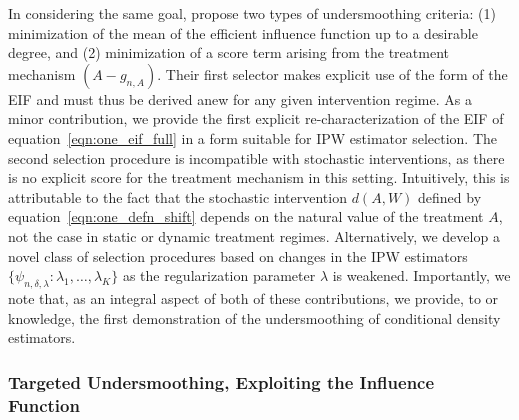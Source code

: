 In considering the same goal, \citet{ertefaie2020nonparametric} propose two
types of undersmoothing criteria: (1) minimization of the mean of the efficient
influence function up to a desirable degree, and (2) minimization of a score
term arising from the treatment mechanism $(A - g_{n,A})$. Their first selector
makes explicit use of the form of the EIF and must thus be derived anew for any
given intervention regime. As a minor contribution, we provide the first
explicit re-characterization of the EIF of equation~\eqref{eqn:one_eif_full} in
a form suitable for IPW estimator selection. The second selection procedure is
incompatible with stochastic interventions, as there is no explicit score for
the treatment mechanism in this setting. Intuitively, this is attributable to
the fact that the stochastic intervention $d(A,W)$ defined by
equation~\eqref{eqn:one_defn_shift} depends on the natural value of the
treatment $A$, not the case in static or dynamic treatment regimes.
Alternatively, we develop a novel class of selection procedures based on changes
in the IPW estimators $\{\psi_{n,\delta,\lambda}: \lambda_1, \ldots, \lambda_K
\}$ as the regularization parameter $\lambda$ is weakened. Importantly, we note
that, as an integral aspect of both of these contributions, we provide, to or
knowledge, the first demonstration of the undersmoothing of conditional density
estimators.

\subsubsection{Targeted Undersmoothing, Exploiting the Influence Function}

